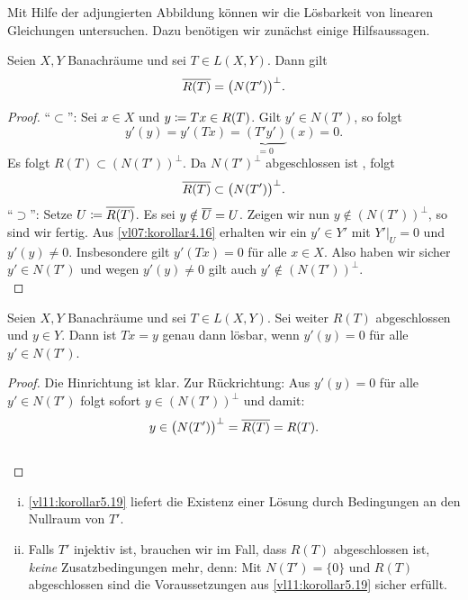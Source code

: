 \pagebreak[3]
Mit Hilfe der adjungierten Abbildung können wir die Lösbarkeit von linearen
Gleichungen untersuchen. Dazu benötigen wir zunächst einige Hilfsaussagen.

\begin{thSatz} \label{vl11:satz5.18}
    Seien $X,Y$ Banachräume und sei $T\in L(X,Y)$. Dann gilt
    \[ \overline{R(T)} = \bigl( N(T') \bigr)^\perp  . \]
\end{thSatz}

\begin{proof}
    \enquote{$\subset$}: Sei $x\in X$ und $y\coloneqq Tx\in R(T)$. Gilt $y'\in
    N(T')$, so folgt 
    \[ y'(y) = y'(Tx) = \underbrace{(T'y')}_{=0}(x) = 0  . \]
    Es folgt $R(T) \subset (N(T'))^\perp$. Da $N(T')^\perp$
    abgeschlossen ist , folgt
    \[ \overline{R(T)} \subset \bigl( N(T') \bigr)^\perp  . \]
    \enquote{$\supset$}: Setze $U\coloneqq\overline{R(T)}$. Es sei
    $y\notin\overline{U}=U$. Zeigen wir nun $y\notin (N(T'))^\perp$, so sind 
    wir fertig. Aus \cref{vl07:korollar4.16} erhalten wir ein $y'\in Y'$ mit
    $Y'\vert_U = 0$ und $y'(y)\neq 0$. Insbesondere gilt $y'(Tx)=0$ für alle
    $x\in X$. Also haben wir sicher $y'\in N(T')$ und wegen $y'(y)\neq 0$ gilt
    auch $y'\notin (N(T'))^\perp$.
    \\
\end{proof}

\begin{thKorollar} \label{vl11:korollar5.19}
    Seien $X,Y$ Banachräume und sei $T\in L(X,Y)$. Sei weiter $R(T)$
    abgeschlossen und $y\in Y$. Dann ist $Tx=y$ genau dann lösbar, wenn
    $y'(y)=0$ für alle $y'\in N(T')$.
\end{thKorollar}

\begin{proof}
    Die Hinrichtung ist klar. Zur Rückrichtung:
    Aus $y'(y)=0$ für alle $y'\in N(T')$ folgt sofort $y\in (N(T'))^\perp$ und
    damit: 
    \begin{gather*}
        y \in \bigl( N(T') \bigr)^\perp = \overline{R(T)} = R(T)  .
        \\
        \qedhere
    \end{gather*}
\end{proof}

\nnBemerkung
\begin{enumerate}[(i)]
    \item 
        \cref{vl11:korollar5.19} liefert die Existenz einer Lösung durch
        Bedingungen an den Nullraum von $T'$.
    \item
        Falls $T'$ injektiv ist, brauchen wir im Fall, dass $R(T)$ abgeschlossen
        ist, \emph{keine} Zusatzbedingungen mehr, denn:
        Mit $N(T')=\{0\}$ und $R(T)$ abgeschlossen sind die Voraussetzungen aus
        \cref{vl11:korollar5.19} sicher erfüllt.
\end{enumerate}

